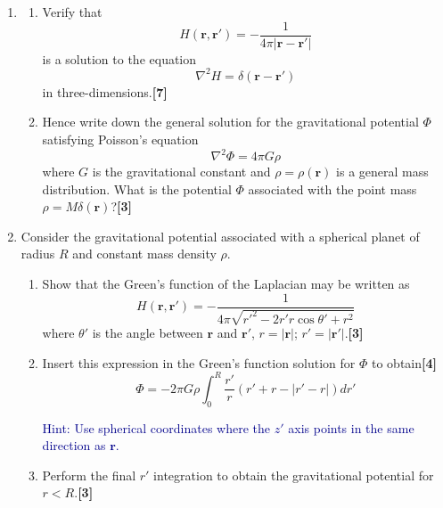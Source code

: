 \documentclass[a4paper]{article}
\begin{document}
\begin{qns}
\leavevmode
\begin{enumerate}[label=(\roman*)]
\item 
\begin{enumerate}[label=(\alph*)]
\item Verify that
$$H(\mathbf{r},\mathbf{r'})=-\frac{1}{4\pi|\mathbf{r}-\mathbf{r'}|}$$
is a solution to the equation
$$\nabla^2H=\delta(\mathbf{r}-\mathbf{r'})$$
in three-dimensions.\hfill\textbf{[7]}
\item Hence write down the general solution for the gravitational potential $\Phi$ satisfying Poisson’s equation
$$\nabla^2\Phi=4\pi G\rho$$
where $G$ is the gravitational constant and $\rho=\rho(\mathbf{r})$ is a general mass distribution. What is the potential $\Phi$ associated with the point mass $\rho=M\delta(\mathbf{r})$?\hfill\textbf{[3]}
\end{enumerate}
\item Consider the gravitational potential associated with a spherical planet of radius $R$ and constant mass density $\rho$.
\begin{enumerate}[label=(\alph*)]
\item Show that the Green’s function of the Laplacian may be written as
$$H(\mathbf{r},\mathbf{r'})=-\frac{1}{4\pi\sqrt{r'^2-2r'r\cos\theta'+r^2}}$$
where $\theta'$ is the angle between $\mathbf{r}$ and $\mathbf{r'}$, $r = |\mathbf{r}|$; $r' = |\mathbf{r'}|$.\hfill\textbf{[3]}
\item Insert this expression in the Green’s function solution for $\Phi$ to obtain\hfill\textbf{[4]}
$$\Phi=-2\pi G\rho\int_0^R\frac{r'}{r}(r'+r-|r'-r|)dr'$$
\begin{mdframed}
\textcolor{darkblue}{Hint: Use spherical coordinates where the $z'$ axis points in the same direction as $\mathbf{r}$.}
\end{mdframed}
\item Perform the final $r'$ integration to obtain the gravitational potential for $r < R$.\hfill\textbf{[3]}
\end{enumerate}
\end{enumerate}
\end{qns}
\end{document}
